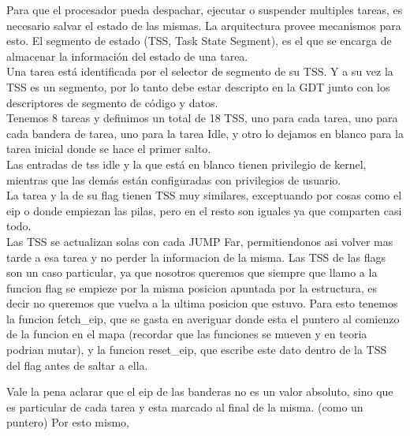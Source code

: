 Para que el procesador pueda despachar, ejecutar o suspender multiples tareas, es necesario salvar el estado de las mismas. La arquitectura provee mecanismos para esto. El segmento de estado (TSS, Task State Segment), es el que se encarga de almacenar la informaci\'on del estado de una tarea.\\
Una tarea est\'a identificada por el selector de segmento de su TSS. Y a su vez la TSS es un segmento, por lo tanto debe estar descripto en la GDT junto con los descriptores de segmento de c\'odigo y datos.\\
Tenemos 8 tareas y definimos un total de 18 TSS, uno para cada tarea, uno para cada bandera de tarea, uno para la tarea Idle, y otro lo dejamos en blanco para la tarea inicial donde se hace el primer salto.\\
Las entradas de tss idle y la que est\'a en blanco tienen privilegio de kernel, mientras que las dem\'as est\'an configuradas con privilegios de usuario.\\
La tarea y la de su flag tienen TSS muy similares, exceptuando por cosas como el eip o donde empiezan las pilas, pero en el resto son iguales ya que comparten casi todo.\\

Las TSS se actualizan solas con cada JUMP Far, permitiendonos asi volver mas tarde a esa tarea y no perder la informacion de la misma. Las TSS de las flags son 
un caso particular, ya que nosotros queremos que siempre que llamo a la funcion flag se empieze por la misma posicion apuntada por la estructura, es decir no queremos 
que vuelva a la ultima posicion que estuvo. Para esto tenemos la funcion fetch\_eip, que se gasta en averiguar donde esta el puntero al comienzo de la funcion en el mapa 
(recordar que las funciones se mueven y en teoria podrian mutar), y la funcion reset\_eip, que escribe este dato dentro de la TSS del flag antes de saltar a ella.

Vale la pena aclarar que el eip de las banderas no es un valor absoluto, sino que es particular de cada tarea y esta marcado al final de la misma. (como un puntero)
Por esto mismo,  

